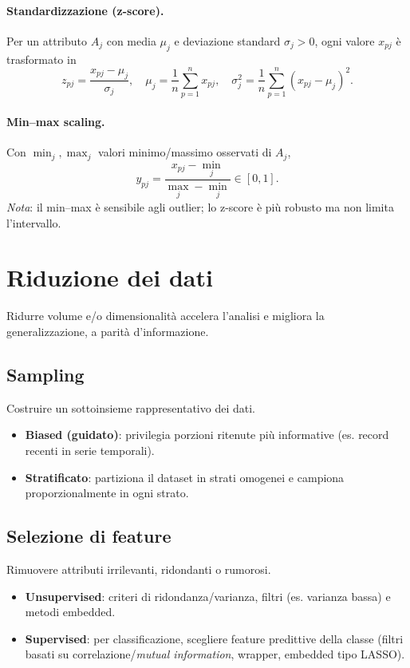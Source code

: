 \paragraph{Standardizzazione (z-score).} Per un attributo $A_j$ con media $\mu_j$ e deviazione standard $\sigma_j>0$, ogni valore $x_{pj}$ è trasformato in
\[
  z_{pj}=\frac{x_{pj}-\mu_j}{\sigma_j},\quad \mu_j=\frac{1}{n}\sum_{p=1}^n x_{pj},\quad \sigma_j^2=\frac{1}{n}\sum_{p=1}^n(x_{pj}-\mu_j)^2.
\]
\paragraph{Min--max scaling.} Con $\min_j,\max_j$ valori minimo/massimo osservati di $A_j$,
\[
  y_{pj}=\frac{x_{pj}-\min_j}{\max_j-\min_j}\in[0,1].
\]
\emph{Nota}: il min--max è sensibile agli outlier; lo z-score è più robusto ma non limita l'intervallo.

\section{Riduzione dei dati}\label{sec:riduzione}
Ridurre volume e/o dimensionalità accelera l'analisi e migliora la generalizzazione, a parità d'informazione.

\subsection{Sampling}\label{subsec:sampling}
Costruire un sottoinsieme rappresentativo dei dati.
\begin{itemize}
  \item \textbf{Biased (guidato)}: privilegia porzioni ritenute più informative (es. record recenti in serie temporali).
  \item \textbf{Stratificato}: partiziona il dataset in strati omogenei e campiona proporzionalmente in ogni strato.
\end{itemize}

\subsection{Selezione di feature}\label{subsec:feature-selection}
Rimuovere attributi irrilevanti, ridondanti o rumorosi.
\begin{itemize}
  \item \textbf{Unsupervised}: criteri di ridondanza/varianza, filtri (es. varianza bassa) e metodi embedded.
  \item \textbf{Supervised}: per classificazione, scegliere feature predittive della classe (filtri basati su correlazione/\emph{mutual information}, wrapper, embedded tipo LASSO).
\end{itemize}


